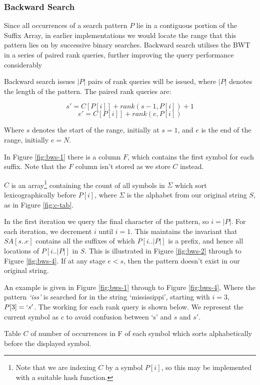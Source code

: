 \subsubsection{Backward Search}
Since all occurrences of a search pattern $P$ lie in a contiguous portion of the 
Suffix Array, in earlier implementations we would locate the range that this 
pattern lies on by successive binary searches. Backward search utilises the BWT 
in a series of paired rank queries, further improving the query performance 
considerably ~\cite{claude2008, FGM09, ferragina07, GMR06, MN07:rankselect,
MN07:selfindex, marin2003, MN06}

Backward search issues $|P|$ pairs of rank queries will be issued, where $|P|$ 
denotes the length of the pattern. The paired rank queries are:

					$$ s' = C[P[i]] + rank(s - 1, P[i]) + 1$$
					$$ e' = C[P[i]] + rank(e, P[i])$$

Where $s$ denotes the start of the range, initially at $s = 1$, and $e$ is the 
end of the range, initially $e = N$.

In Figure \ref{fig:bws-1} there is a column $F$, which contains the first 
symbol for each suffix. Note that the $F$ column isn't stored as we store 
$C$ instead.

$C$ is an array\footnote{Note that we are indexing $C$ by a symbol $P[i]$, so 
this may be implemented with a suitable hash function.} containing the count of 
all symbols in $\Sigma$ which sort lexicographically before $P[i]$, where 
$\Sigma$ is the alphabet from our original string $S$, as in Figure 
\ref{fig:c-tab}.

In the first iteration 
we query the final character of the pattern, so $i = |P|$.  For each 
iteration, we decrement $i$ until $i = 1$. This maintains the invariant that
$SA[s..e]$ contains all the suffixes of which $P[i..|P|]$ is a prefix, and hence
all locations of $P[i..|P|]$ in $S$. This is illustrated in Figure 
\ref{fig:bws-2} through to Figure \ref{fig:bws-4}. If at any stage $e < 
s$, then the pattern doesn't exist in our original string.

An example is given in Figure \ref{fig:bws-1} through to Figure \ref{fig:bws-4},
Where the pattern \emph{`iss'} is searched for in the string `mississippi',
starting with $i = 3$, $P[3] = `s'$. The working for each rank query is shown 
below. We represent the current symbol as $c$ to avoid confusion between `s' and 
$s$ and $s'$.


			{Table $C$ of number of occurrences in F of each symbol which
			sorts alphabetically before the displayed symbol.}

